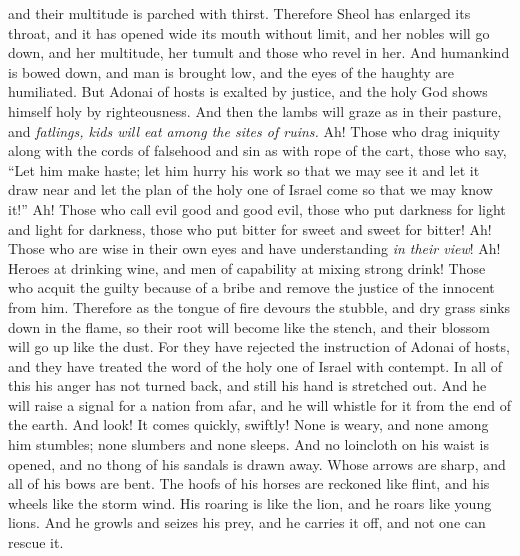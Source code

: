 \begin{biblechapter}
and their multitude is parched with thirst.
\verse Therefore Sheol has enlarged its throat, 
and it has opened wide its mouth without limit, 
and her nobles will go down, and her multitude, 
her tumult and those who revel in her.
\verse And humankind is bowed down, 
and man is brought low, 
and the eyes of the haughty are humiliated.
\verse But Adonai of hosts is exalted by justice, 
and the holy God shows himself holy by righteousness.
\verse And then the lambs will graze as in their pasture, 
and \textit{fatlings, kids will eat among the sites of ruins.}
\verse Ah! Those who drag iniquity along with the cords of falsehood 
and sin as with rope of the cart,
\verse those who say, 
“Let him make haste; 
let him hurry his work 
so that we may see it 
and let it draw near 
and let the plan of the holy one of Israel come 
so that we may know it!”
\verse Ah! Those who call evil good and good evil, 
those who put darkness for light and light for darkness, 
those who put bitter for sweet and sweet for bitter!
\verse Ah! Those who are wise in their own eyes 
and have understanding \textit{in their view}!
\verse Ah! Heroes at drinking wine, 
and men of capability at mixing strong drink!
\verse Those who acquit the guilty because of a bribe 
and remove the justice of the innocent from him.
\verse Therefore as the tongue of fire devours the stubble, 
and dry grass sinks down in the flame, 
so their root will become like the stench, 
and their blossom will go up like the dust. 
For they have rejected the instruction of Adonai of hosts, 
and they have treated the word of the holy one of Israel with contempt.
 In all of this his anger has not turned back, 
and still his hand is stretched out.
\verse And he will raise a signal for a nation from afar, 
and he will whistle for it from the end of the earth. 
And look! It comes quickly, swiftly!
\verse None is weary, 
and none among him stumbles; 
none slumbers and none sleeps. 
And no loincloth on his waist is opened, 
and no thong of his sandals is drawn away.
\verse Whose arrows are sharp, 
and all of his bows are bent. 
The hoofs of his horses are reckoned like flint, 
and his wheels like the storm wind.
\verse His roaring is like the lion, 
and he roars like young lions. 
And he growls and seizes his prey, 
and he carries it off, 
and not one can rescue it.
\end{biblechapter}

